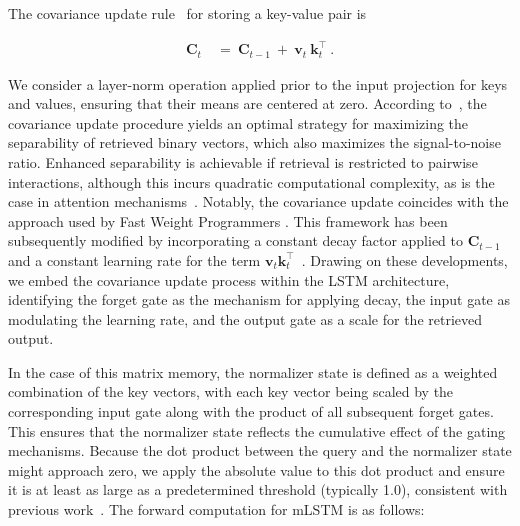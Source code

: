The covariance update rule~\citep{Sejnowski:77,Dayan:91} for storing a key-value pair is

\begin{align}
\mathbf{C}_t \ &= \ \mathbf{C}_{t-1} \ + \ \mathbf{v}_{t} \ \mathbf{k}_t^\top \ .
\end{align}

We consider a layer-norm operation applied prior to the input projection for keys and values, ensuring that their means are centered at zero. According to~\citep{Dayan:91}, the covariance update procedure yields an optimal strategy for maximizing the separability of retrieved binary vectors, which also maximizes the signal-to-noise ratio. Enhanced separability is achievable if retrieval is restricted to pairwise interactions, although this incurs quadratic computational complexity, as is the case in attention mechanisms~\citep{Krotov:16,Krotov:17,Ramsauer:21}. Notably, the covariance update coincides with the approach used by Fast Weight Programmers \citep{Schmidhuber:92ncfastweights,Schlag:21}. This framework has been subsequently modified by incorporating a constant decay factor applied to $\mathbf{C}_{t-1}$ and a constant learning rate for the term 
$\mathbf{v}_{t} \mathbf{k}_t ^\top$~\citep{Ba:16}. Drawing on these developments, we embed the covariance update process within the LSTM architecture, identifying the forget gate as the mechanism for applying decay, the input gate as modulating the learning rate, and the output gate as a scale for the retrieved output.

In the case of this matrix memory, the normalizer state is defined as a weighted combination of the key vectors, with each key vector being scaled by the corresponding input gate along with the product of all subsequent forget gates. This ensures that the normalizer state reflects the cumulative effect of the gating mechanisms. Because the dot product between the query and the normalizer state might approach zero, we apply the absolute value to this dot product and ensure it is at least as large as a predetermined threshold (typically 1.0), consistent with previous work~\citep{Sun:23arxiv}. The forward computation for mLSTM is as follows:

